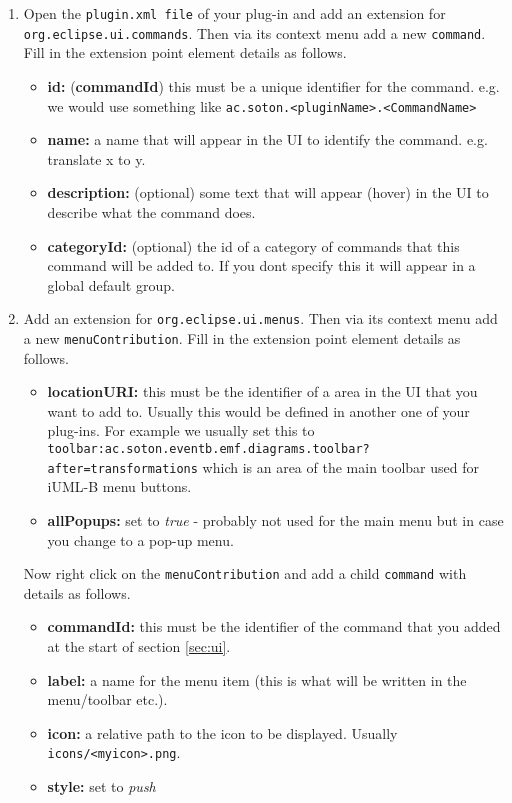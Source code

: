 \begin{enumerate}
	\item
	Open the \texttt{plugin.xml file} of your plug-in and add an extension for \texttt{org.eclipse.ui.commands}. Then via its context menu add a new \texttt{command}. Fill in the extension point element details as follows.
	\begin{itemize}
		\item \textbf{id:} (\textbf{commandId}) this must be a unique identifier for the command. e.g. we would use something like \texttt{ac.soton.<pluginName>.<CommandName>}
		\item \textbf{name:} a name that will appear in the UI to identify the command. e.g. translate x to y.
		\item \textbf{description:} (optional) some text that will appear (hover) in the UI to describe what the command does.
		\item \textbf{categoryId:} (optional) the id of a category of commands that this command will be added to. If you dont specify this it will appear in a global default group.
	\end{itemize}
	
	\item
	Add an extension for \texttt{org.eclipse.ui.menus}. Then via its context menu add a new \texttt{menuContribution}. Fill in the extension point element details as follows.
	\begin{itemize}
		\item \textbf{locationURI:} this must be the identifier of a area in the UI that you want to add to. Usually this would be defined in another one of your plug-ins. For example we usually set this to \\
		\texttt{toolbar:ac.soton.eventb.emf.diagrams.toolbar?after=transformations}
		which is an area of the main toolbar used for iUML-B menu buttons.
		\item \textbf{allPopups:} set to \emph{true} - probably not used for the main menu but in case you change to a pop-up menu.
	\end{itemize}
	Now right click on the \texttt{menuContribution} and add a child \texttt{command} with details as follows.
	\begin{itemize}
		\item \textbf{commandId:} this must be the identifier of the command that you added at the start of section \ref{sec:ui}.
		\item \textbf{label:} a name for the menu item (this is what will be written in the menu/toolbar etc.).
		\item \textbf{icon:} a relative path to the icon to be displayed. Usually \texttt{icons/<myicon>.png}. 
		\item \textbf{style:} set to \emph{push}
	\end{itemize}
		

\end{enumerate}
